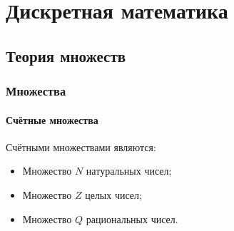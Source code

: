 \part{Дискретная математика}

\chapter{Теория множеств}

\section{Множества}

\subsection{Счётные множества}

Счётными множествами являются:
\begin{itemize}
  \item Множество $N$ натуральных чисел;
  \item Множество $Z$ целых чисел;
  \item Множество $Q$ рациональных чисел.
\end{itemize}

